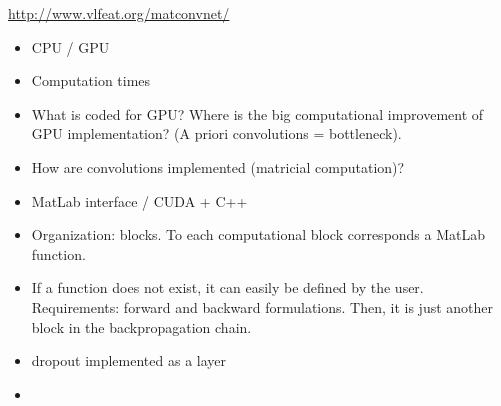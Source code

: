 \url{http://www.vlfeat.org/matconvnet/}
\cite{arXiv:1412.4564}

\begin{itemize}
 \item CPU / GPU
 \item Computation times
 \item What is coded for GPU? Where is the big computational improvement of GPU implementation? (A priori convolutions = bottleneck). 
 \item How are convolutions implemented (matricial computation)?
 \item MatLab interface / CUDA + C++
 \item Organization: blocks. To each computational block corresponds a MatLab function. 
 \item If a function does not exist, it can easily be defined by the user. Requirements: forward and backward formulations. Then, it is just another 
block in the backpropagation chain. 
 \item dropout implemented as a layer
 \item 
\end{itemize}
